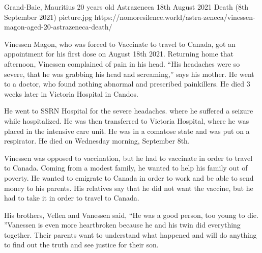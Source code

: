 {Grand-Baie, Mauritius}
{20 years old}
{Astrazeneca}
{18th August 2021}
{Death (8th September 2021)}
{picture.jpg}
{https://nomoresilence.world/astra-zeneca/vinessen-magon-aged-20-astrazeneca-death/}
{

Vinessen Magon, who was forced to Vaccinate to travel to Canada, got an
appointment for his first dose on August 18th 2021. Returning home that
afternoon, Vinessen complained of pain in his head. “His headaches were so
severe, that he was grabbing his head and screaming,” says his mother. He went
to a doctor, who found nothing abnormal and prescribed painkillers. He died 3
weeks later in Victoria Hospital in Candos.

He went to SSRN Hospital for the severe headaches. where he suffered a seizure
while hospitalized. He was then transferred to Victoria Hospital, where he was
placed in the intensive care unit. He was in a comatose state and was put on a
respirator. He died on Wednesday morning, September 8th.

Vinessen was opposed to vaccination, but he had to vaccinate in order to travel
to Canada. Coming from a modest family, he wanted to help his family out of
poverty. He wanted to emigrate to Canada in order to work and be able to send
money to his parents. His relatives say that he did not want the vaccine, but he
had to take it in order to travel to Canada.

His brothers, Vellen and Vanessen said, “He was a good person, too young to
die. ”Vanessen is even more heartbroken because he and his twin did everything
together. Their parents want to understand what happened and will do anything to
find out the truth and see justice for their son.

}
